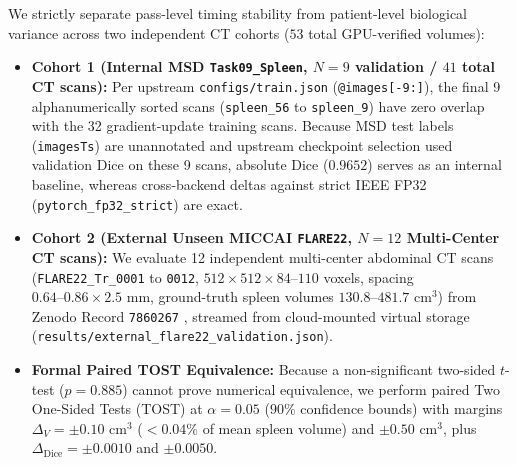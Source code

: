 \documentclass[10pt,twocolumn]{article}
\begin{document}
We strictly separate pass-level timing stability from patient-level biological variance across two independent CT cohorts ($53$ total GPU-verified volumes):
\begin{itemize}
    \item \textbf{Cohort 1 (Internal MSD \texttt{Task09\_Spleen}, $N = 9$ validation / $41$ total CT scans):} Per upstream \texttt{configs/train.json} (\texttt{@images[-9:]}), the final 9 alphanumerically sorted scans (\texttt{spleen\_56} to \texttt{spleen\_9}) have zero overlap with the 32 gradient-update training scans. Because MSD test labels (\texttt{imagesTs}) are unannotated and upstream checkpoint selection used validation Dice on these 9 scans, absolute Dice ($0.9652$) serves as an internal baseline, whereas cross-backend deltas against strict IEEE FP32 (\texttt{pytorch\_fp32\_strict}) are exact.
    \item \textbf{Cohort 2 (External Unseen MICCAI \texttt{FLARE22}, $N = 12$ Multi-Center CT scans):} We evaluate 12 independent multi-center abdominal CT scans (\texttt{FLARE22\_Tr\_0001} to \texttt{0012}, $512 \times 512 \times 84\text{--}110$ voxels, spacing $0.64\text{--}0.86 \times 2.5\text{ mm}$, ground-truth spleen volumes $130.8\text{--}481.7\text{ cm}^3$) from Zenodo Record \texttt{7860267} \cite{ma2023flare}, streamed from cloud-mounted virtual storage (\texttt{results/external\_flare22\_validation.json}).
    \item \textbf{Formal Paired TOST Equivalence:} Because a non-significant two-sided $t$-test ($p = 0.885$) cannot prove numerical equivalence, we perform paired Two One-Sided Tests (TOST) \cite{schuirmann1987} at $\alpha = 0.05$ ($90\%$ confidence bounds) with margins $\Delta_V = \pm 0.10\text{ cm}^3$ ($< 0.04\%$ of mean spleen volume) and $\pm 0.50\text{ cm}^3$, plus $\Delta_{\text{Dice}} = \pm 0.0010$ and $\pm 0.0050$.
\end{itemize}
\end{document}
